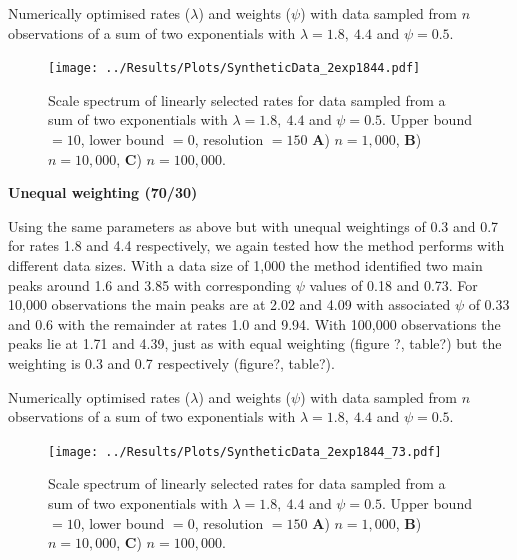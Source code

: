 \documentclass[11pt,usenames,dvipsnames,a4paper]{article}
\begin{document}
\begin{table}[H]
	\centering
	\caption{Numerically optimised rates ($\lambda$) and weights ($\psi$) with data sampled from $n$ observations of a sum of two exponentials with $\lambda = 1.8,\ 4.4$ and $\psi = 0.5$.}
	
\end{table}


\begin{figure}[H]
	\centering
	\texttt{[image: ../Results/Plots/SyntheticData\_2exp1844.pdf]}
	\caption{Scale spectrum of linearly selected rates for data sampled from a sum of two exponentials with $\lambda = 1.8,\ 4.4$ and $\psi = 0.5$. Upper bound $= 10$, lower bound $= 0$, resolution $= 150$ \textbf{A}) $n = 1,000$, \textbf{B}) $n = 10,000$,  \textbf{C}) $n = 100,000$.}
\end{figure}

\noindent
\textbf{Unequal weighting (70/30)}
\begin{linenumbers}

Using the same parameters as above but with unequal weightings of 0.3 and 0.7 for rates 1.8 and 4.4 respectively, we again tested how the method performs with different data sizes. With a data size of 1,000 the method identified two main peaks around 1.6 and 3.85 with corresponding $\psi$ values of 0.18 and 0.73. For 10,000 observations the main peaks are at 2.02 and 4.09 with associated $\psi$ of 0.33 and 0.6 with the remainder at rates 1.0 and 9.94. With 100,000 observations the peaks lie at 1.71 and 4.39, just as with equal weighting (figure ?, table?) but the weighting is 0.3 and 0.7 respectively (figure?, table?).
\end{linenumbers}
\begin{table}[H]
	\centering
	\caption{Numerically optimised rates ($\lambda$) and weights ($\psi$) with data sampled from $n$ observations of a sum of two exponentials with $\lambda = 1.8,\ 4.4$ and $\psi = 0.5$.}
	
\end{table}

\begin{figure}[H]
	\centering
	\texttt{[image: ../Results/Plots/SyntheticData\_2exp1844\_73.pdf]}
	\caption{Scale spectrum of linearly selected rates for data sampled from a sum of two exponentials with $\lambda = 1.8,\ 4.4$ and $\psi = 0.5$. Upper bound $= 10$, lower bound $= 0$, resolution $= 150$ \textbf{A}) $n = 1,000$, \textbf{B}) $n = 10,000$,  \textbf{C}) $n = 100,000$.}
\end{figure}
\end{document}
